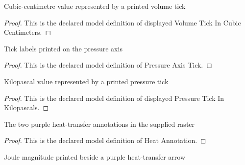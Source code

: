 \begin{definition}
  \label{def:physics:phyx-mini-0421:phyxminiproblems-problemphyxmini0421-displayedvolumetickincubiccentimeters}
  Cubic-centimetre value represented by a printed volume tick
\end{definition}
\begin{proof}
  This is the declared model definition of displayed Volume Tick In Cubic Centimeters.
\end{proof}
\begin{definition}
  \label{def:physics:phyx-mini-0421:phyxminiproblems-problemphyxmini0421-pressureaxistick}
  Tick labels printed on the pressure axis
\end{definition}
\begin{proof}
  This is the declared model definition of Pressure Axis Tick.
\end{proof}
\begin{definition}
  \label{def:physics:phyx-mini-0421:phyxminiproblems-problemphyxmini0421-displayedpressuretickinkilopascals}
  Kilopascal value represented by a printed pressure tick
\end{definition}
\begin{proof}
  This is the declared model definition of displayed Pressure Tick In Kilopascals.
\end{proof}
\begin{definition}
  \label{def:physics:phyx-mini-0421:phyxminiproblems-problemphyxmini0421-heatannotation}
  The two purple heat-transfer annotations in the supplied raster
\end{definition}
\begin{proof}
  This is the declared model definition of Heat Annotation.
\end{proof}
\begin{definition}
  \label{def:physics:phyx-mini-0421:phyxminiproblems-problemphyxmini0421-displayedheatannotationinjoules}
  Joule magnitude printed beside a purple heat-transfer arrow
\end{definition}
